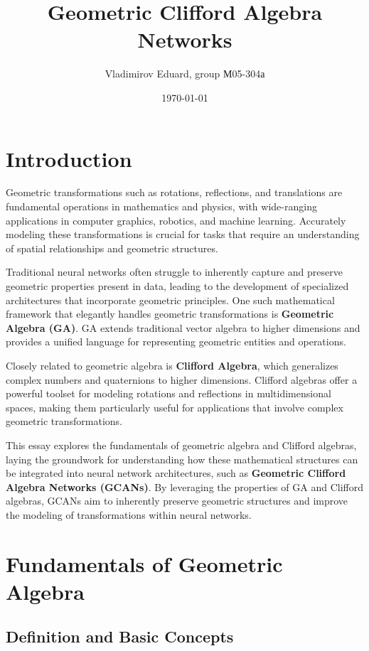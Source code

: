 \documentclass[a4paper,14pt]{article}
\author{Vladimirov Eduard, group М05-304а}
\title{\textbf{Geometric Clifford Algebra Networks}}
\date{\today}
\theoremstyle{plain} %
\theoremstyle{definition} %
\theoremstyle{remark} %
\theoremstyle{definition}
\theoremstyle{remark}
\theoremstyle{remark}
\begin{document}
	\maketitle
	
	\section{Introduction}
	
	Geometric transformations such as rotations, reflections, and translations are fundamental operations in mathematics and physics, with wide-ranging applications in computer graphics, robotics, and machine learning. Accurately modeling these transformations is crucial for tasks that require an understanding of spatial relationships and geometric structures.
	
	Traditional neural networks often struggle to inherently capture and preserve geometric properties present in data, leading to the development of specialized architectures that incorporate geometric principles. One such mathematical framework that elegantly handles geometric transformations is \textbf{Geometric Algebra (GA)}. GA extends traditional vector algebra to higher dimensions and provides a unified language for representing geometric entities and operations.
	
	Closely related to geometric algebra is \textbf{Clifford Algebra}, which generalizes complex numbers and quaternions to higher dimensions. Clifford algebras offer a powerful toolset for modeling rotations and reflections in multidimensional spaces, making them particularly useful for applications that involve complex geometric transformations.
	
	This essay explores the fundamentals of geometric algebra and Clifford algebras, laying the groundwork for understanding how these mathematical structures can be integrated into neural network architectures, such as \textbf{Geometric Clifford Algebra Networks (GCANs)}. By leveraging the properties of GA and Clifford algebras, GCANs aim to inherently preserve geometric structures and improve the modeling of transformations within neural networks.
	
	\section{Fundamentals of Geometric Algebra}
	
	\subsection{Definition and Basic Concepts}
	
\end{document}
